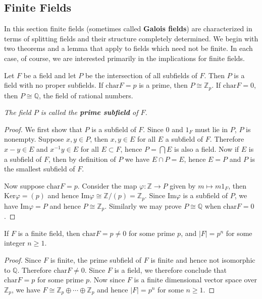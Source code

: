 \subsection{Finite Fields}
In this section finite fields (sometimes called \textbf{Galois fields}) are characterized in terms of splitting fields and their structure completely determined. We begin with two theorems and a lemma that apply to fields which need not be finite. In each case, of course, we are interested primarily in the implications for finite fields.
\begin{theorem}
Let $F$ be a field and let $P$ be the intersection of all subfields of $F$. Then $P$ is a field with no proper subfields. If $\mathrm{char}F=p$ is a prime, then $P\cong\mathbb{Z}_p$. If $\mathrm{char}F=0$, then $P\cong\mathbb{Q}$, the field of rational numbers.
\end{theorem}
\begin{note}\em
The field $P$ is called the \textbf{prime subfield} of $F$.
\end{note}
\begin{proof}
We first show that $P$ is a subfield of $F$. Since $0$ and $1_F$ must lie in $P$, $P$ is nonempty. Suppose $x,y\in P$, then $x,y\in E$ for all $E$ a subfield of $F$. Therefore $x-y\in E$ and $x^{-1}y\in E$ for all $E\subset F$, hence $P=\bigcap E$ is also a field. Now if $E$ is a subfield of $F$, then by definition of $P$ we have $E\cap P=E$, hence $E=P$ and $P$ is the smallest subfield of $F$.\par
Now suppose $\mathrm{char}F=p$. Consider the map $\varphi:\mathbb{Z}\to P$ given by $m\mapsto m1_F$, then $\mathrm{Ker}\varphi=(p)$ and hence $\mathrm{Im}\varphi\cong\mathbb{Z}/(p)=\mathbb{Z}_p$. Since $\mathrm{Im}\varphi$ is a subfield of $P$, we have $\mathrm{Im}\varphi=P$ and hence $P\cong\mathbb{Z}_p$. Similarly we may prove $P\cong\mathbb{Q}$ when $\mathrm{char}F=0$.
\end{proof}
\begin{corollary}
If $F$ is a finite field, then $\mathrm{char}F=p\ne 0$ for some prime $p$, and $|F|=p^n$ for some integer $n\ge 1$.
\end{corollary}
\begin{proof}
Since $F$ is finite, the prime subfield of $F$ is finite and hence not isomorphic to $\mathbb{Q}$. Therefore $\mathrm{char}F\ne 0$. Since $F$ is a field, we therefore conclude that $\mathrm{char}F=p$ for some prime $p$. Now since $F$ is a finite dimensional vector space over $\mathbb{Z}_p$, we have $F\cong\mathbb{Z}_p\oplus\cdots\oplus\mathbb{Z}_p$ and hence $|F|=p^n$ for some $n\ge 1$.
\end{proof}
